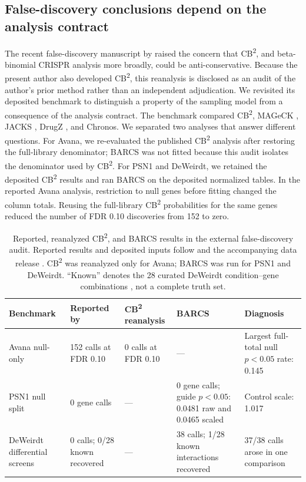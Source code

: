 \subsection{False-discovery conclusions depend on the analysis contract}
\label{sec:fdr-audit}

The recent false-discovery manuscript by \citet{dempster2025fdr} raised the
concern that CB\textsuperscript{2}, and beta-binomial CRISPR analysis more
broadly, could be anti-conservative.  Because the present author also
developed CB\textsuperscript{2}, this reanalysis is disclosed as an audit of
the author's prior method rather than an independent adjudication.  We
revisited its deposited benchmark
\citep{dempster2025fdrdata} to distinguish a property of the sampling model
from a consequence of the analysis contract.  The benchmark compared
CB\textsuperscript{2}, MAGeCK \citep{li2014mageck}, JACKS
\citep{allen2019jacks}, DrugZ \citep{colic2019drugz}, and Chronos.  We separated two
analyses that answer different questions.  For Avana, we re-evaluated the
published CB\textsuperscript{2} analysis \citep{jeong2019beta} after restoring
the full-library denominator; BARCS was not fitted because this audit isolates
the denominator used by CB\textsuperscript{2}.  For PSN1 and DeWeirdt, we
retained the deposited CB\textsuperscript{2} results and ran BARCS on the
deposited normalized tables.  In the reported Avana analysis, restriction to
null genes before fitting changed the column totals.  Reusing the full-library
CB\textsuperscript{2} probabilities for the same genes reduced the number of
FDR 0.10 discoveries from 152 to zero.

\begin{table}[htbp]
\centering
\caption{Reported, reanalyzed CB\textsuperscript{2}, and BARCS results in the
external false-discovery audit.  Reported results and deposited inputs follow
\citet{dempster2025fdr} and the accompanying data release
\citep{dempster2025fdrdata}.  CB\textsuperscript{2} was reanalyzed only for
Avana; BARCS was run for PSN1 and DeWeirdt.  ``Known'' denotes the 28 curated
DeWeirdt condition--gene combinations \citep{deweirdt2020isogenic}, not a
complete truth set.}
\label{tab:chronosaudit}
\footnotesize
\setlength{\tabcolsep}{3pt}
\renewcommand{\arraystretch}{1.10}
\begin{tabular}{p{}p{}p{}
                p{}p{}}
\toprule
Benchmark & Reported by \citet{dempster2025fdr} &
CB\textsuperscript{2} reanalysis & BARCS & Diagnosis\\
\midrule
Avana null-only &
152 calls at FDR 0.10 &
0 calls at FDR 0.10 &
--- &
Largest full-total null $p<0.05$ rate: 0.145\\
\addlinespace[2pt]
PSN1 null split &
0 gene calls &
--- &
0 gene calls; guide $p<0.05$: 0.0481 raw and 0.0465 scaled &
Control scale: 1.017\\
\addlinespace[2pt]
DeWeirdt differential screens &
0 calls; 0/28 known recovered &
--- &
38 calls; 1/28 known interactions recovered &
37/38 calls arose in one comparison\\
\bottomrule
\end{tabular}
\end{table}

